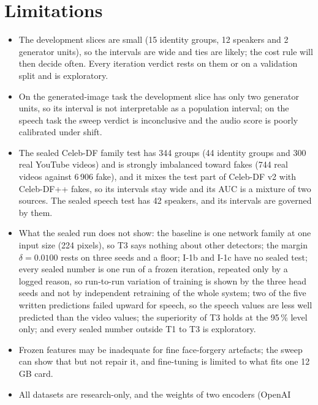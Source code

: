 \documentclass[conference,a4paper]{IEEEtran_nodash}
\begin{document}
\section{Limitations}\label{sec:limits}
\begin{itemize}
  \item The development slices are small (15 identity groups, 12 speakers and
        2 generator units), so the intervals are wide and ties are likely; the
        cost rule will then decide often. Every iteration verdict rests on them
        or on a validation split and is exploratory.
  \item On the generated-image task the development slice has only two
        generator units, so its interval is not interpretable as a population
        interval; on the speech task the sweep verdict is inconclusive and the
        audio score is poorly calibrated under shift.
  \item The sealed Celeb-DF family test has 344 groups (44 identity groups and
        300 real YouTube videos) and is strongly imbalanced toward fakes (744
        real videos against 6\,906 fake), and it mixes the test part of
        Celeb-DF v2 with Celeb-DF++ fakes, so its intervals stay wide and its
        AUC is a mixture of two sources. The sealed speech test has 42 speakers,
        and its intervals are governed by them.
  \item What the sealed run does not show: the baseline is one network family at
        one input size (224 pixels), so T3 says nothing about other detectors;
        the margin $\delta=0.0100$ rests on three seeds and a floor; I-1b and
        I-1c have no sealed test; every sealed number is one run of a frozen
        iteration, repeated only by a logged reason, so run-to-run variation of
        training is shown by the three head seeds and not by independent
        retraining of the whole system; two of the five written predictions
        failed upward for speech, so the speech values are less well predicted
        than the video values; the superiority of T3 holds at the 95\,\% level
        only; and every sealed number outside T1 to T3 is exploratory.
  \item Frozen features may be inadequate for fine face-forgery artefacts; the
        sweep can show that but not repair it, and fine-tuning is limited to
        what fits one 12\,GB card.
  \item All datasets are research-only, and the weights of two encoders (OpenAI

\end{itemize}
\end{document}
